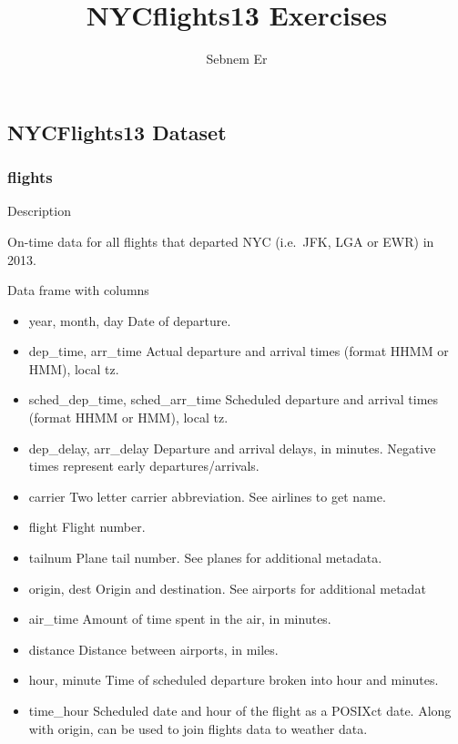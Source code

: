 \documentclass[
]{article}
\title{NYCflights13 Exercises}
\author{Sebnem Er}
\date{}
\providecommand{\tightlist}{%
  \setlength{\itemsep}{0pt}\setlength{\parskip}{0pt}}
\begin{document}
\maketitle

\hypertarget{nycflights13-dataset}{%
\subsection{NYCFlights13 Dataset}\label{nycflights13-dataset}}

\hypertarget{flights}{%
\subsubsection{flights}\label{flights}}

Description

On-time data for all flights that departed NYC (i.e.~JFK, LGA or EWR) in
2013.

Data frame with columns

\begin{itemize}
\tightlist
\item
  year, month, day Date of departure.
\item
  dep\_time, arr\_time Actual departure and arrival times (format HHMM
  or HMM), local tz.
\item
  sched\_dep\_time, sched\_arr\_time Scheduled departure and arrival
  times (format HHMM or HMM), local tz.
\item
  dep\_delay, arr\_delay Departure and arrival delays, in minutes.
  Negative times represent early departures/arrivals.
\item
  carrier Two letter carrier abbreviation. See airlines to get name.
\item
  flight Flight number.
\item
  tailnum Plane tail number. See planes for additional metadata.
\item
  origin, dest Origin and destination. See airports for additional
  metadat
\item
  air\_time Amount of time spent in the air, in minutes.
\item
  distance Distance between airports, in miles.
\item
  hour, minute Time of scheduled departure broken into hour and minutes.
\item
  time\_hour Scheduled date and hour of the flight as a POSIXct date.
  Along with origin, can be used to join flights data to weather data.
\end{itemize}
\end{document}

